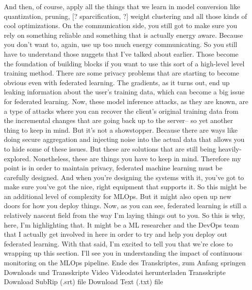 {{{{{{{{{    And then, of course, apply all the things
    that we learn in model conversion like quantization, pruning,
    [? sparcification, ?] weight clustering and all those kinds
    of cool optimizations.
    On the communication side, you still got to make
    sure you rely on something reliable and something that is actually
    energy aware.
    Because you don't want to, again, use up too much energy communicating.
    So you still have to understand those nuggets that I've talked about earlier.
    Those become the foundation of building blocks
    if you want to use this sort of a high-level level training method.
    There are some privacy problems that are starting to become obvious even
    with federated learning.
    The gradients, as it turns out, end up leaking information
    about the user's training data, which can become
    a big issue for federated learning.
    Now, these model inference attacks, as they are known,
    are a type of attacks where you can recover the client's original training
    data from the incremental changes that are going back up to the server-- so
    yet another thing to keep in mind.
    But it's not a showstopper.
    Because there are ways like doing secure aggregation
    and injecting noise into the actual data that
    allows you to hide some of these issues.
    But these are solutions that are still being heavily-explored.
    Nonetheless, these are things you have to keep in mind.
    Therefore my point is in order to maintain privacy,
    federated machine learning must be carefully designed.
    And when you're designing the systems with it,
    you've got to make sure you've got the nice, right equipment that supports it.
    So this might be an additional level of complexity for MLOps.
    But it might also open up new doors for how you deploy things.
    Now, as you can see, federated learning is still
    a relatively nascent field from the way I'm laying things out to you.
    So this is why, here, I'm highlighting that.
    It might be a ML researcher and the DevOps team
    that I actually get involved in here in order to try and help you
    deploy out federated learning.
    With that said, I'm excited to tell you that we're
    close to wrapping up this section.
    I'll see you in understanding the impact of continuous monitoring
    on the MLOps pipeline.
    Ende des Transkriptes, zum Anfang springen
    Downloads und Transskripte
    Video
    Videodatei herunterladen
    Transskripte
    Download SubRip (.srt) file
    Download Text (.txt) file        
   
}}}}}}}}}
